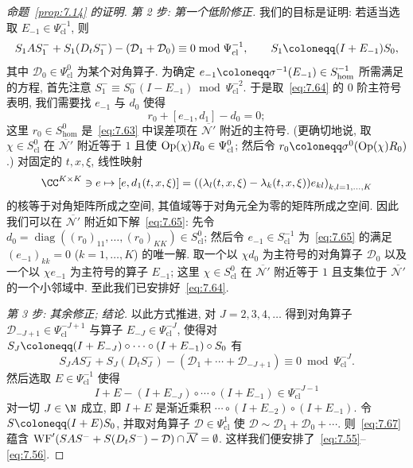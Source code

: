 \begin{proof}[命题~\ref{prop:7.14} 的证明]
\emph{第 2 步: 第一个低阶修正.} 我们的目标是证明: 若适当选取 $E_{-1} \in \Psi^{-1}_{\mathrm{cl}}$, 则
\begin{equation}\label{eq:7.64}
    S_1 A S_1^- + S_1(D_t S_1^-) - (\mathcal{D}_1 + \mathcal{D}_0) \equiv 0 \bmod \Psi^{-1}_{\mathrm{cl}}, \qquad S_1 \defeq (I + E_{-1})S_0,
\end{equation}
其中 $\mathcal{D}_0 \in \Psi^0_{\mathrm{cl}}$ 为某个对角算子. 为确定 $e_{-1} \defeq \sigma^{-1}(E_{-1}) \in S^{-1}_{\mathrm{hom}}$ 所需满足的方程, 首先注意 $S_1^- \equiv S_0^-(I - E_{-1}) \bmod \Psi^{-2}_{\mathrm{cl}}$. 于是取~\eqref{eq:7.64} 的 $0$ 阶主符号表明, 我们需要找 $e_{-1}$ 与 $d_0$ 使得
\begin{equation}\label{eq:7.65}
    r_0 + [e_{-1}, d_1] - d_0 = 0;
\end{equation}
这里 $r_0 \in S^0_{\mathrm{hom}}$ 是~\eqref{eq:7.63} 中误差项在 $\overline{\mathcal{N}'}$ 附近的主符号. (更确切地说, 取 $\chi \in S^0_{\mathrm{cl}}$ 在 $\overline{\mathcal{N}'}$ 附近等于 $1$ 且使 $\operatorname{Op}(\chi)R_0 \in \Psi^0_{\mathrm{cl}}$; 然后令 $r_0 \defeq \sigma^0(\Op(\chi)R_0)$.) 对固定的 $t, x, \xi$, 线性映射
\begin{equation}\label{eq:7.66}
    \CC^{K \times K} \ni e \mapsto [e, d_1(t, x, \xi)] = \left( (\lambda_l(t, x, \xi) - \lambda_k(t, x, \xi)) e_{kl} \right)_{k, l = 1, \ldots, K}
\end{equation}
的核等于对角矩阵所成之空间, 其值域等于对角元全为零的矩阵所成之空间. 因此我们可以在 $\overline{\mathcal{N}'}$ 附近如下解~\eqref{eq:7.65}: 先令 $d_0 = \operatorname{diag}((r_0)_{11}, \ldots, (r_0)_{KK}) \in S^0_{\mathrm{cl}}$; 然后令 $e_{-1} \in S^{-1}_{\mathrm{cl}}$ 为~\eqref{eq:7.65} 的满足 $(e_{-1})_{kk} = 0$ ($k = 1, \ldots, K$) 的唯一解. 取一个以 $\chi d_0$ 为主符号的对角算子 $\mathcal{D}_0$ 以及一个以 $\chi e_{-1}$ 为主符号的算子 $E_{-1}$; 这里 $\chi \in S^0_{\mathrm{cl}}$ 在 $\overline{\mathcal{N}'}$ 附近等于 $1$ 且支集位于 $\overline{\mathcal{N}'}$ 的一个小邻域中. 至此我们已安排好~\eqref{eq:7.64}.

\emph{第 3 步: 其余修正; 结论.} 以此方式推进, 对 $J = 2, 3, 4, \ldots$ 得到对角算子 $\mathcal{D}_{-J+1} \in \Psi^{-J+1}_{\mathrm{cl}}$ 与算子 $E_{-J} \in \Psi^{-J}_{\mathrm{cl}}$, 使得对 $S_J \defeq (I + E_{-J}) \circ \cdots \circ (I + E_{-1}) \circ S_0$ 有
\begin{equation}\label{eq:7.67}
    S_J A S_J^- + S_J(D_t S_J^-) - (\mathcal{D}_1 + \cdots + \mathcal{D}_{-J+1}) \equiv 0 \bmod \Psi^{-J}_{\mathrm{cl}}.
\end{equation}
然后选取 $E \in \Psi^{-1}_{\mathrm{cl}}$ 使得
\begin{equation}\label{eq:7.68}
    I + E - (I + E_{-J}) \circ \cdots \circ (I + E_{-1}) \in \Psi^{-J-1}_{\mathrm{cl}}
\end{equation}
对一切 $J \in \N$ 成立, 即 $I + E$ 是渐近乘积 $\cdots \circ (I + E_{-2}) \circ (I + E_{-1})$. 令 $S \defeq (I + E)S_0$, 并取对角算子 $\mathcal{D} \in \Psi^1_{\mathrm{cl}}$ 使 $\mathcal{D} \sim \mathcal{D}_1 + \mathcal{D}_0 + \cdots$. 则~\eqref{eq:7.67} 蕴含 $\operatorname{WF}'(SAS^- + S(D_t S^-) - \mathcal{D}) \cap \overline{\mathcal{N}} = \emptyset$. 这样我们便安排了~\eqref{eq:7.55}--\eqref{eq:7.56}.


\end{proof}
